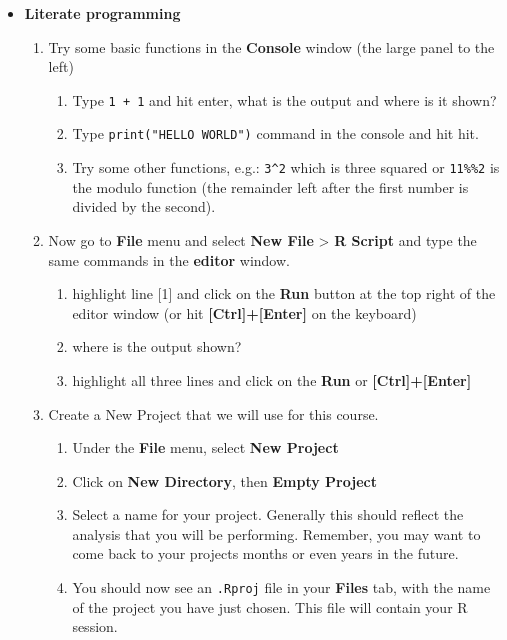 \documentclass[a4paper]{book}
\providecommand{\tightlist}{%
  \setlength{\itemsep}{0pt}\setlength{\parskip}{0pt}}
\newenvironment{rmdblock}[1]
  {\vspace{1.5em}\begin{shaded*}
  \begin{itemize}
  \renewcommand{\labelitemi}{
    \raisebox{-.7\height}[0pt][0pt]{
      {\setkeys{Gin}{width=3em,keepaspectratio}\texttt{[image: images/\#1]}}
    }
  }
  \item
  }
  {
  \end{itemize}
  \end{shaded*}
  }
\newenvironment{rmdexercise}
  {\begin{rmdblock}{exercise}}
  {\end{rmdblock}}
\begin{document}
\begin{rmdexercise}
\textbf{Literate programming}

\begin{enumerate}
\def\labelenumi{\arabic{enumi}.}
\item
  Try some basic functions in the \textbf{Console} window (the large
  panel to the left)

  \begin{enumerate}
  \def\labelenumii{\alph{enumii})}
  \tightlist
  \item
    Type \texttt{1\ +\ 1} and hit enter, what is the output and where is
    it shown?
  \item
    Type \texttt{print("HELLO\ WORLD")} command in the console and hit
    hit.
  \item
    Try some other functions, e.g.: \texttt{3\^{}2} which is three
    squared or \texttt{11\%\%2} is the modulo function (the remainder
    left after the first number is divided by the second).
  \end{enumerate}
\item
  Now go to \textbf{File} menu and select \textbf{New File}
  \textgreater{} \textbf{R Script} and type the same commands in the
  \textbf{editor} window.

  \begin{enumerate}
  \def\labelenumii{\alph{enumii})}
  \tightlist
  \item
    highlight line {[}1{]} and click on the \textbf{Run} button at the
    top right of the editor window (or hit
    \textbf{{[}Ctrl{]}+{[}Enter{]}} on the keyboard)
  \item
    where is the output shown?
  \item
    highlight all three lines and click on the \textbf{Run} or
    \textbf{{[}Ctrl{]}+{[}Enter{]}}
  \end{enumerate}
\item
  Create a New Project that we will use for this course.

  \begin{enumerate}
  \def\labelenumii{\alph{enumii})}
  \tightlist
  \item
    Under the \textbf{File} menu, select \textbf{New Project}
  \item
    Click on \textbf{New Directory}, then \textbf{Empty Project}
  \item
    Select a name for your project. Generally this should reflect the
    analysis that you will be performing. Remember, you may want to come
    back to your projects months or even years in the future.
  \item
    You should now see an \texttt{.Rproj} file in your \textbf{Files}
    tab, with the name of the project you have just chosen. This file
    will contain your R session.
  \end{enumerate}
\end{enumerate}
\end{rmdexercise}
\end{document}
